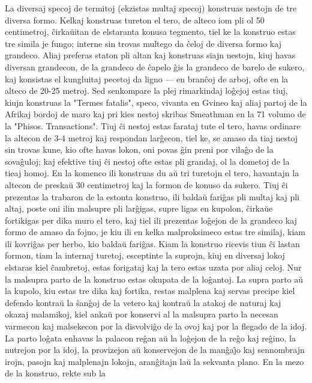    La diversaj specoj de termitoj (ekzistas multaj specoj) konstruas
nestojn de tre diversa formo. Kelkaj konstruas tureton el tero, de
alteco iom pli ol 50 centimetroj, \^cirka\u uitan de elstaranta
konusa tegmento, tiel ke la konstruo estas tre simila je fungo;
interne sin trovas multego da \^celoj de diversa formo kaj grandeco.
Aliaj preferas staton pli altan kaj konstruas siajn nestojn, kiuj
havas diversan grandecon, de la grandeco de \^capelo \^gis la
grandeco de barelo de sukero, kaj konsistas el kungluitaj pecetoj da
ligno --- en bran\^coj de arboj, ofte en la alteco de 20-25 metroj.
Sed senkompare la plej rimarkindaj lo\^gejoj estas tiuj, kiujn
konstruas la "Termes fatalis", speco, vivanta en Gvineo kaj aliaj
partoj de la Afrikaj bordoj de maro kaj pri kies nestoj skribas
Smeathman en la 71 volumo de la "Phisos. Transactions". Tiuj \^ci
nestoj estas farataj tute el tero, havas ordinare la altecon de 3-4
metroj kaj respondan lar\^gecon, tiel ke, se amaso da tiaj nestoj
sin trovas kune, kio ofte havas lokon, oni povas \^gin preni por
vila\^go de la sova\^guloj; kaj efektive tiuj \^ci nestoj ofte estas
pli grandaj, ol la dometoj de la tieaj homoj. En la komenco ili
konstruas du a\u u tri turetojn el tero, havantajn la altecon de
preska\u u 30 centimetroj kaj la formon de konuso da sukero. Tiuj
\^ci prezentas la trabaron de la estonta konstruo, ili balda\u u
fari\^gas pli multaj kaj pli altaj, poste oni ilin malsupre pli
lar\^gigas, supre ligas en kupolon, \^cirka\u ue fortikigas per dika
muro el tero, kaj tiel ili prezentas lo\^gejon de la grandeco kaj
formo de amaso da fojno, je kiu ili en kelka malproksimeco estas tre
similaj, kiam ili kovri\^gas per herbo, kio balda\u u fari\^gas.
Kiam la konstruo ricevis tiun \^ci lastan formon, tiam la internaj
turetoj, esceptinte la suprojn, kiuj en diversaj lokoj elstaras kiel
\^cambretoj, estas forigataj kaj la tero estas uzata por aliaj
celoj. Nur la malsupra parto de la konstruo estas okupata de la
lo\^gantoj. La supra parto a\u u la kupolo, kiu estas tre dika kaj
fortika, restas malplena kaj servas precipe kiel defendo kontra\u u
la \^san\^goj de la vetero kaj kontra\u u la atakoj de naturaj kaj
okazaj malamikoj, kiel anka\u u por konservi al la malsupra parto la
necesan varmecon kaj malsekecon por la disvolvi\^go de la ovoj kaj
por la flegado de la idoj. La parto lo\^gata enhavas la palacon
re\^gan a\u u la lo\^gejon de la re\^go kaj re\^gino, la nutrejon
por la idoj, la provizejon a\u u konservejon de la man\^ga\^{\j}o
kaj sennombrajn irojn, pasojn kaj malplenajn lokojn, aran\^gitajn
la\u u la sekvanta plano. En la mezo de la konstruo, rekte sub la
